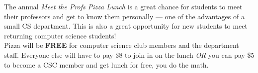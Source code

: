 \documentclass{article}
\begin{document}


The annual \emph{Meet the Profs Pizza Lunch} is a great chance for students to meet their professors and get to know them personally --- one of the advantages of a small CS department.
This is also a great opportunity for new students to meet returning computer science students!\\

Pizza will be \textbf{FREE} for computer science club members and the department staff. Everyone else will have to pay \$8 to join in on the lunch \emph{OR} you can pay \$5 to become a CSC member and get lunch for free, you do the math.

\end{document}
